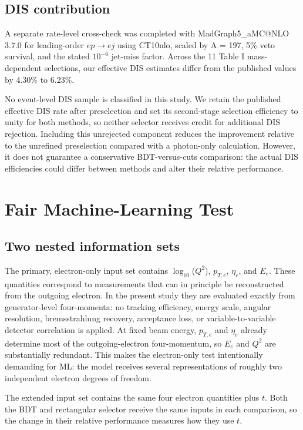 \documentclass[particles,article,submit,moreauthors,pdftex]{Definitions/mdpi}
\begin{document}
\subsection{DIS contribution}\label{sec:3.3}

A separate rate-level cross-check was completed with MadGraph5\_aMC@NLO 3.7.0 for leading-order $ep\to ej$ using CT10nlo, scaled by A = 197, 5\% veto survival, and the stated $10^{-6}$ jet-miss factor. Across the 11 Table I mass-dependent selections, our effective DIS estimates differ from the published values by 4.30\% to 6.23\%.

No event-level DIS sample is classified in this study. We retain the published effective DIS rate after preselection and set its second-stage selection efficiency to unity for both methods, so neither selector receives credit for additional DIS rejection. Including this unrejected component reduces the improvement relative to the unrefined preselection compared with a photon-only calculation. However, it does not guarantee a conservative BDT-versus-cuts comparison: the actual DIS efficiencies could differ between methods and alter their relative performance.

\section{Fair Machine-Learning Test}\label{sec:4}

\subsection{Two nested information sets}\label{sec:4.1}

The primary, electron-only input set contains $\log_{10}$($Q^2$), $p_{T,e}$, $\eta_e$, and $E_e$. These quantities correspond to measurements that can in principle be reconstructed from the outgoing electron. In the present study they are evaluated exactly from generator-level four-momenta: no tracking efficiency, energy scale, angular resolution, bremsstrahlung recovery, acceptance loss, or variable-to-variable detector correlation is applied. At fixed beam energy, $p_{T,e}$ and $\eta_e$ already determine most of the outgoing-electron four-momentum, so $E_e$ and $Q^2$ are substantially redundant. This makes the electron-only test intentionally demanding for ML: the model receives several representations of roughly two independent electron degrees of freedom.

The extended input set contains the same four electron quantities plus $t$. Both the BDT and rectangular selector receive the same inputs in each comparison, so the change in their relative performance measures how they use $t$.
\end{document}
